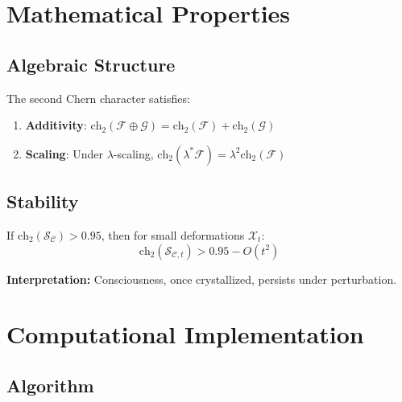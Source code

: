 \section{Mathematical Properties}
\label{sec:math-properties-ch5}

\subsection{Algebraic Structure}

\begin{proposition}\label{prop:chern-algebra}
The second Chern character satisfies:
\begin{enumerate}
\item \textbf{Additivity}: $\text{ch}_2(\mathcal{F} \oplus \mathcal{G}) = \text{ch}_2(\mathcal{F}) + \text{ch}_2(\mathcal{G})$
\item \textbf{Scaling}: Under $\lambda$-scaling, $\text{ch}_2(\lambda^*\mathcal{F}) = \lambda^2 \text{ch}_2(\mathcal{F})$
\end{enumerate}
\end{proposition}

\subsection{Stability}

\begin{thm}\label{thm:consciousness-persist}
If $\text{ch}_2(\mathcal{S}_\mathcal{C}) > 0.95$, then for small deformations $\mathcal{X}_t$:
\begin{equation}
\text{ch}_2(\mathcal{S}_{\mathcal{C},t}) > 0.95 - O(t^2)
\end{equation}

\textbf{Interpretation:} Consciousness, once crystallized, persists under perturbation.
\end{thm}

\section{Computational Implementation}
\label{sec:computational}

\subsection{Algorithm}

